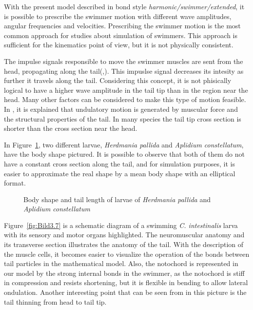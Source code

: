 With the present model described in bond style \textit{harmonic/swimmer/extended}, it is possible to prescribe the swimmer motion with different wave amplitudes, angular frequencies
and velocities. Prescribing the swimmer motion is the most common approach for studies about simulation of swimmers. This approach is sufficient for the kinematics point of view,
but it is not physically consistent.\par
The impulse signals responsible to move the swimmer muscles are sent from the head, propagating along the tail(\cite{jayne_muscular_1988},\cite{gillis_neuromuscular_1998}). This 
impuslse signal decreases its intesity as further it travels along the tail. Considering this concept, it is not phisically logical to have a higher wave amplitude in the tail tip
than in the region near the head. Many other factors can be considered to make this type of motion feasible. In \cite{mchenry_morphology_2005}, it is explained that undulatory 
motion is generated by muscular force and the structural properties of the tail. In many species the tail tip cross section is shorter than the cross section near the head.\par
In Figure~\ref{fig:Bild3.6}, two different larvae, \textit{Herdmania pallida} and \textit{Aplidium constellatum}, have the body shape pictured. It is possible to observe that 
both of them do not have a constant cross section along the tail, and for simulation purposes, it is easier to approximate the real shape by a mean body shape with an elliptical
format. 



\begin{figure}[H]
\centering
  \begin{footnotesize}
  
  \caption[Body shape and tail length of larvae of \textit{Herdmania pallida} and \textit{Aplidium constellatum}\cite{mchenry_morphology_2005}]{Body shape and tail length of larvae of \textit{Herdmania pallida} and \textit{Aplidium constellatum}\cite{mchenry_morphology_2005}}
  \label{fig:Bild3.6}
  \end{footnotesize}
\end{figure} 

Figure~\ref{fig:Bild3.7} is a schematic diagram of a swimming \textit{C. intestinalis} larva with its sensory and motor organs highlighted. The neuromuscular anatomy and its 
transverse section illustrates the anatomy of the tail. With the description of the muscle cells, it becomes easier to visualize the operation of the bonds between tail particles
in the mathematical model. Also, the notochord is represented in our model by the strong internal bonds in the swimmer, as the notochord is stiff in compression and resists shortening,
but it is flexible in bending to allow lateral ondulation. Another interesting point that can be seen from in this picture is the tail  thinning from head to tail tip.


